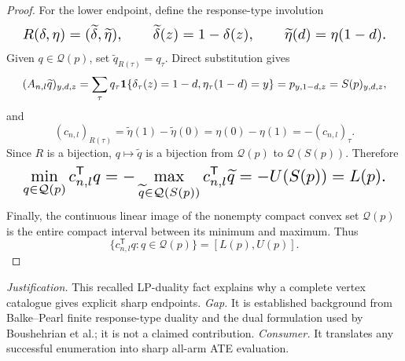 \documentclass{article}
\begin{document}
\begin{proof}
For the lower endpoint, define the response-type involution
\[
\makebox[\linewidth][c]{\resizebox{0.98\linewidth}{!}{\par\noindent \makebox[\linewidth][c]{\resizebox{0.98\linewidth}{!}{\(\displaystyle \displaystyle R(\delta,\eta)=(\widetilde\delta,\widetilde\eta),\qquad \widetilde\delta(z)=1-\delta(z),\qquad \widetilde\eta(d)=\eta(1-d).\)}}\par\noindent}}
\]
Given \(q\in\mathcal Q(p)\), set \(\widetilde q_{R(\tau)}=q_\tau\). Direct substitution gives
\[
\makebox[\linewidth][c]{\resizebox{0.98\linewidth}{!}{\par\noindent \makebox[\linewidth][c]{\resizebox{0.98\linewidth}{!}{\(\displaystyle \displaystyle (A_{n,l}\widetilde q)_{y,d,z}=\sum_\tau q_\tau\mathbf 1\{\delta_\tau(z)=1-d,\eta_\tau(1-d)=y\}=p_{y,1-d,z}=S(p)_{y,d,z},\)}}\par\noindent}}
\]
and
\[
(c_{n,l})_{R(\tau)}=\widetilde\eta(1)-\widetilde\eta(0)=\eta(0)-\eta(1)=-(c_{n,l})_\tau.
\]
Since \(R\) is a bijection, \(q\mapsto\widetilde q\) is a bijection from \(\mathcal Q(p)\) to \(\mathcal Q(S(p))\). Therefore
\[
\makebox[\linewidth][c]{\resizebox{0.98\linewidth}{!}{\par\noindent \makebox[\linewidth][c]{\resizebox{0.98\linewidth}{!}{\(\displaystyle \displaystyle \min_{q\in\mathcal Q(p)}c_{n,l}^{\mathsf T}q=-\max_{\widetilde q\in\mathcal Q(S(p))}c_{n,l}^{\mathsf T}\widetilde q=-U(S(p))=L(p).\)}}\par\noindent}}
\]
Finally, the continuous linear image of the nonempty compact convex set \(\mathcal Q(p)\) is the entire compact interval between its minimum and maximum. Thus
\[
\{c_{n,l}^{\mathsf T}q:q\in\mathcal Q(p)\}=[L(p),U(p)].
\]
\end{proof}
\par\smallskip\noindent \textit{Justification.} This recalled LP-duality fact explains why a complete vertex catalogue gives explicit sharp endpoints. \textit{Gap.} It is established background from Balke--Pearl finite response-type duality and the dual formulation used by Boushehrian et al.; it is not a claimed contribution. \textit{Consumer.} It translates any successful enumeration into sharp all-arm ATE evaluation.
\end{document}
